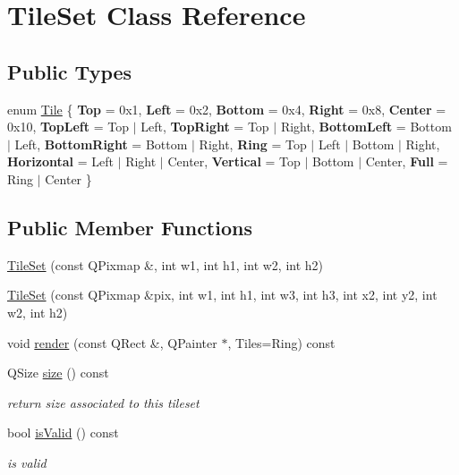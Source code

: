 \hypertarget{class_tile_set}{}\section{Tile\+Set Class Reference}
\label{class_tile_set}
\subsection*{Public Types}
\begin{DoxyCompactItemize}
\item 
enum \hyperlink{class_tile_set_a6055c65e4828f7fcb768403b3ad91ab6}{Tile} \{ \newline
{\bfseries Top} = 0x1, 
{\bfseries Left} = 0x2, 
{\bfseries Bottom} = 0x4, 
{\bfseries Right} = 0x8, 
\newline
{\bfseries Center} = 0x10, 
{\bfseries Top\+Left} = Top $\vert$ Left, 
{\bfseries Top\+Right} = Top $\vert$ Right, 
{\bfseries Bottom\+Left} = Bottom $\vert$ Left, 
\newline
{\bfseries Bottom\+Right} = Bottom $\vert$ Right, 
{\bfseries Ring} = Top $\vert$ Left $\vert$ Bottom $\vert$ Right, 
{\bfseries Horizontal} = Left $\vert$ Right $\vert$ Center, 
{\bfseries Vertical} = Top $\vert$ Bottom $\vert$ Center, 
\newline
{\bfseries Full} = Ring $\vert$ Center
 \}
\end{DoxyCompactItemize}
\subsection*{Public Member Functions}
\begin{DoxyCompactItemize}
\item 
\hyperlink{class_tile_set_a9f3492dc1a9648c6a3077003508dad7c}{Tile\+Set} (const Q\+Pixmap \&, int w1, int h1, int w2, int h2)
\item 
\hyperlink{class_tile_set_a45c45a34afcdede69b6a10aa4d3a703f}{Tile\+Set} (const Q\+Pixmap \&pix, int w1, int h1, int w3, int h3, int x2, int y2, int w2, int h2)
\item 
void \hyperlink{class_tile_set_aa2b8c89c3836d601c95e367795386a77}{render} (const Q\+Rect \&, Q\+Painter $\ast$, Tiles=Ring) const
\item 
\mbox{\label{class_tile_set_a96c63a5ab8c70d1520d402419af0a7c4}} 
Q\+Size \hyperlink{class_tile_set_a96c63a5ab8c70d1520d402419af0a7c4}{size} () const
\begin{DoxyCompactList}\small\item\em return size associated to this tileset \end{DoxyCompactList}\item 
\mbox{\label{class_tile_set_aaaeeb5e032d06c059d17ea627b5438ea}} 
bool \hyperlink{class_tile_set_aaaeeb5e032d06c059d17ea627b5438ea}{is\+Valid} () const
\begin{DoxyCompactList}\small\item\em is valid \end{DoxyCompactList}\end{DoxyCompactItemize}
